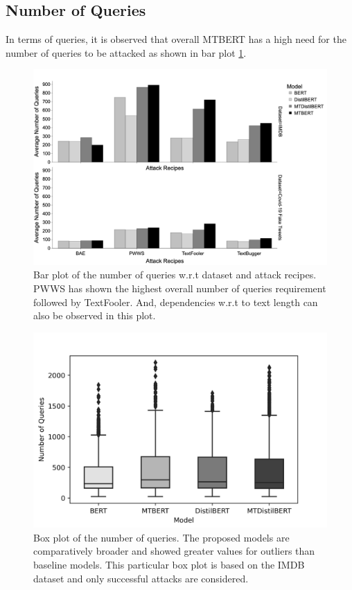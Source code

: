 \documentclass[%
	BCOR=8mm, %
	DIV=12,
	toc=bibliography, %
	toc=listof, %
	oneside, %
	egregdoesnotlikesansseriftitles, %
	]{scrbook}
\begin{document}
\subsection{Number of Queries}
In terms of queries, it is observed that overall MTBERT has a high need for the number of queries to be attacked as shown in bar plot \ref{fig:avgnquebyattackrecipes}.
\begin{figure}[H]
	\centering
    \includegraphics[width=.85\linewidth]{img/AvgNQuebyDataset}
	\caption[Bar plot of the number of queries]{Bar plot of the number of queries w.r.t dataset and attack recipes. PWWS has shown the highest overall number of queries requirement followed by TextFooler.  And, dependencies w.r.t to text length can also be observed in this plot.}
	\label{fig:avgnquebyattackrecipes}
\end{figure}
\begin{figure}[H]
    \centering
    \includegraphics[width=0.70\linewidth]{img/NumQueriesDist_box_IMDB.png}
    \caption[Box plot of the number of queries.]{ Box plot of the number of queries. The proposed models are comparatively broader and showed greater values for outliers than baseline models. This particular box plot is based on the IMDB dataset and only successful attacks are considered.}
    \label{fig:numofqueriesdist}
\end{figure}
\end{document}
